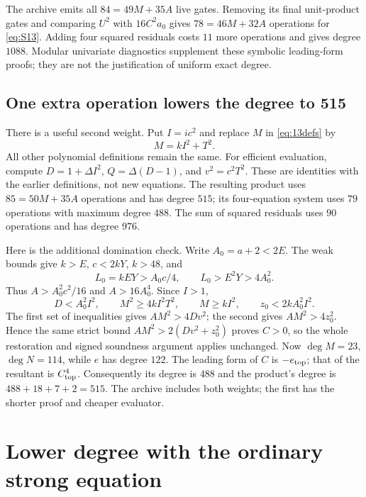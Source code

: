 \documentclass[11pt,a4paper]{article}
\theoremstyle{remark}\newtheorem{remark}[theorem]{Remark}
\begin{document}
The archive emits all $84=49M+35A$ live gates. Removing its final
unit-product gates and comparing $U^2$ with $16C^2a_0$ gives
$78=46M+32A$ operations for \eqref{eq:S13}. Adding four squared
residuals costs $11$ more operations and gives degree $1088$.
Modular univariate diagnostics supplement these symbolic leading-form
proofs; they are not the justification of uniform exact degree.

\subsection{One extra operation lowers the degree to 515}
There is a useful second weight. Put $I=ic^2$ and replace $M$ in
\eqref{eq:13defs} by
\[
 M=kI^2+T^2.
\]
All other polynomial definitions remain the same. For efficient evaluation,
compute $D=1+\Delta I^2$, $Q=\Delta(D-1)$, and $v^2=c^2T^2$.
These are identities with the earlier definitions, not new equations.
The resulting product uses $85=50M+35A$ operations and has degree
$515$; its four-equation system uses $79$ operations with maximum
degree $488$. The sum of squared residuals uses $90$ operations
and has degree $976$.

Here is the additional domination check. Write $A_0=a+2<2E$.
The weak bounds give $k>E$, $c<2kY$, $k>48$, and
\[
 L_0=kEY>A_0c/4,\qquad L_0>E^2Y>4A_0^2.
\]
Thus $A>A_0^2c^2/16$ and $A>16A_0^4$. Since $I>1$,
\[
 D<A_0^2I^2,\qquad M^2\ge4kI^2T^2,\qquad
 M\ge kI^2,\qquad z_0<2kA_0^2I^2.
\]
The first set of inequalities gives $AM^2>4Dv^2$; the second gives
$AM^2>4z_0^2$. Hence the same strict bound
$AM^2>2(Dv^2+z_0^2)$ proves $C>0$, so the whole restoration and
signed soundness argument applies unchanged. Now $\deg M=23$,
$\deg N=114$, while $e$ has degree $122$. The leading form of
$C$ is $-e_{\rm top}$; that of the resultant is $C_{\rm top}^4$.
Consequently its degree is $488$ and the product's degree is
$488+18+7+2=515$. The archive includes both weights; the first
has the shorter proof and cheaper evaluator.

\section{Lower degree with the ordinary strong equation}
\label{sec:ordinary}
\end{document}
